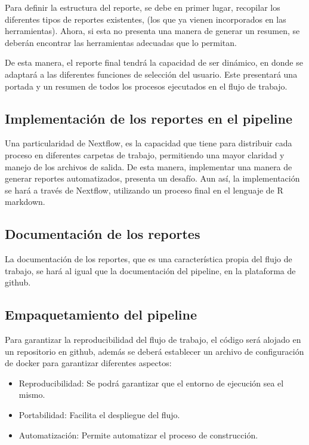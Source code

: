 \documentclass[12pt]{article}
\begin{document}
Para definir la estructura del reporte, se debe en primer lugar, 
recopilar los diferentes tipos de reportes existentes, 
(los que ya vienen incorporados en las herramientas). Ahora, 
si esta no presenta una manera de generar un resumen, se deberán 
encontrar las  herramientas  adecuadas que lo permitan.

De esta manera, el reporte final tendrá la capacidad de ser 
dinámico, en donde se adaptará a las diferentes funciones de 
selección del usuario. Este presentará una portada  y un resumen 
de todos los procesos ejecutados en el flujo de trabajo.

\subsection*{Implementación de los reportes en el pipeline}

Una particularidad de Nextflow, es la capacidad que tiene para 
distribuir cada proceso en diferentes carpetas de trabajo, 
permitiendo una mayor claridad y manejo de los archivos de salida. 
De esta manera, implementar una manera de generar reportes 
automatizados, presenta un desafío. Aun así, la implementación 
se hará a través de Nextflow, utilizando un proceso final en el 
lenguaje de R markdown.

\subsection*{Documentación de los reportes}

La documentación de los reportes, que es una característica propia del flujo de 
trabajo, se hará al igual que la documentación del pipeline, en la 
plataforma de github.

\subsection*{Empaquetamiento del pipeline}

Para garantizar la reproducibilidad del flujo de trabajo, el código será alojado en un repositorio en github, además se deberá establecer un archivo de configuración de docker para garantizar diferentes aspectos:

\begin{itemize}
    \item Reproducibilidad: Se podrá garantizar que el entorno de ejecución sea el mismo. 
    
    \item Portabilidad: Facilita el despliegue del flujo.
    
    \item Automatización: Permite automatizar el proceso de construcción.
\end{itemize}
\end{document}
